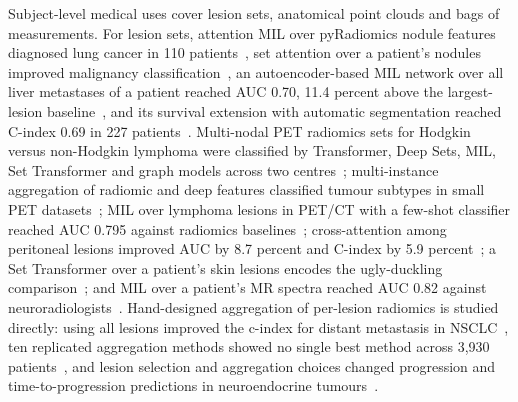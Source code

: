 \documentclass[journal,onecolumn]{IEEEtran}
\begin{document}
Subject-level medical uses cover lesion sets, anatomical point clouds and bags of measurements. For lesion sets, attention MIL over pyRadiomics nodule features diagnosed lung cancer in 110 patients~\cite{Chen2022LungMIL}, set attention over a patient's nodules improved malignancy classification~\cite{Yang2020NoduleSAT}, an autoencoder-based MIL network over all liver metastases of a patient reached AUC 0.70, 11.4 percent above the largest-lesion baseline~\cite{Chen2021AMINN}, and its survival extension with automatic segmentation reached C-index 0.69 in 227 patients~\cite{Alberb2026Automated}. Multi-nodal PET radiomics sets for Hodgkin versus non-Hodgkin lymphoma were classified by Transformer, Deep Sets, MIL, Set Transformer and graph models across two centres~\cite{Karimzadeh2026Revisiting}; multi-instance aggregation of radiomic and deep features classified tumour subtypes in small PET datasets~\cite{Diao2024Multi}; MIL over lymphoma lesions in PET/CT with a few-shot classifier reached AUC 0.795 against radiomics baselines~\cite{Xu2024Hybrid}; cross-attention among peritoneal lesions improved AUC by 8.7 percent and C-index by 5.9 percent~\cite{Li2025MultiStage}; a Set Transformer over a patient's skin lesions encodes the ugly-duckling comparison~\cite{Collenne2024ReSeT}; and MIL over a patient's MR spectra reached AUC 0.82 against neuroradiologists~\cite{Gacheva2026Multiple}. Hand-designed aggregation of per-lesion radiomics is studied directly: using all lesions improved the c-index for distant metastasis in NSCLC~\cite{Wilk2025Towards}, ten replicated aggregation methods showed no single best method across 3,930 patients~\cite{Geady2025Radiomic}, and lesion selection and aggregation choices changed progression and time-to-progression predictions in neuroendocrine tumours~\cite{Sabouri2025Enhancing}.
\end{document}
